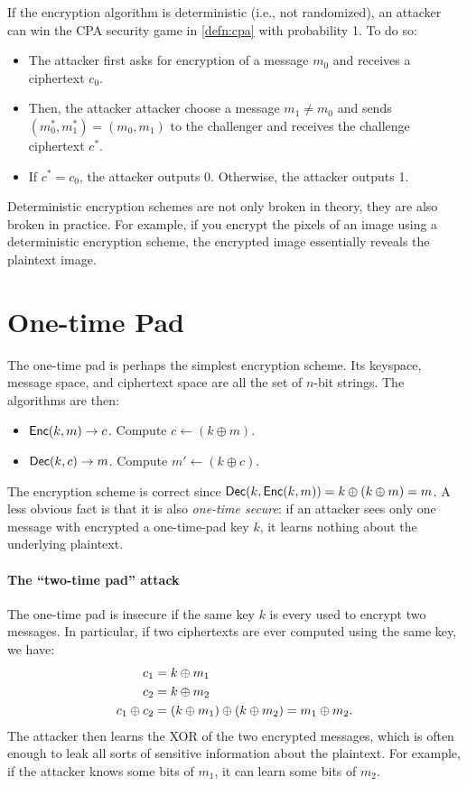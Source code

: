 If the encryption algorithm is deterministic (i.e., not randomized),
an attacker can win the CPA security game in \cref{defn:cpa}
with probability 1.
To do so:
\begin{itemize}[noitemsep]
  \item The attacker first asks for encryption of a message $m_0$
and receives a ciphertext $c_0$.
  \item Then, the attacker attacker choose a message $m_1 \neq m_0$ and
sends $(m^*_0, m^*_1) = (m_0, m_1)$ to the challenger
and receives the challenge ciphertext $c^*$.
  \item If $c^* = c_0$, the attacker outputs 0.
Otherwise, the attacker outputs 1.
\end{itemize}

Deterministic encryption schemes are not only broken in theory,
they are also broken in practice.
For example, if you encrypt the pixels of an image using a deterministic
encryption scheme, the encrypted image essentially reveals the plaintext image.


\section{One-time Pad}
The one-time pad is perhaps the simplest encryption scheme.
Its keyspace, message space, and ciphertext space are all the set of $n$-bit strings.
The algorithms are then:
\begin{itemize}
  \item $\mathsf{Enc}(k, m) \to c$. Compute $c \gets (k \oplus m)$.
  \item $\mathsf{Dec}(k, c) \to m$. Compute $m' \gets (k \oplus c)$.
\end{itemize}

The encryption scheme is correct since $\mathsf{Dec}(k, \mathsf{Enc}(k, m)) = k \oplus (k \oplus m) = m$.
A less obvious fact is that it is also \emph{one-time secure}:
if an attacker sees only one message with encrypted a one-time-pad key $k$,
it learns nothing about the underlying plaintext.

\paragraph{The ``two-time pad'' attack}
The one-time pad is insecure if the same key $k$ is every used to 
encrypt two messages.
In particular, if two ciphertexts are ever computed using the same key, we
have:
\begin{align*}
  c_1 &= k \oplus m_1 \\
  c_2 &= k \oplus m_2 \\ 
  c_1 \oplus c_2 &= (k \oplus m_1) \oplus (k \oplus m_2) = m_1 \oplus m_2.
\end{align*}
The attacker then learns the XOR of the two encrypted messages,
which is often enough to leak all sorts of sensitive information
about the plaintext.
For example, if the attacker knows some bits of $m_1$, it can learn
some bits of $m_2$.


